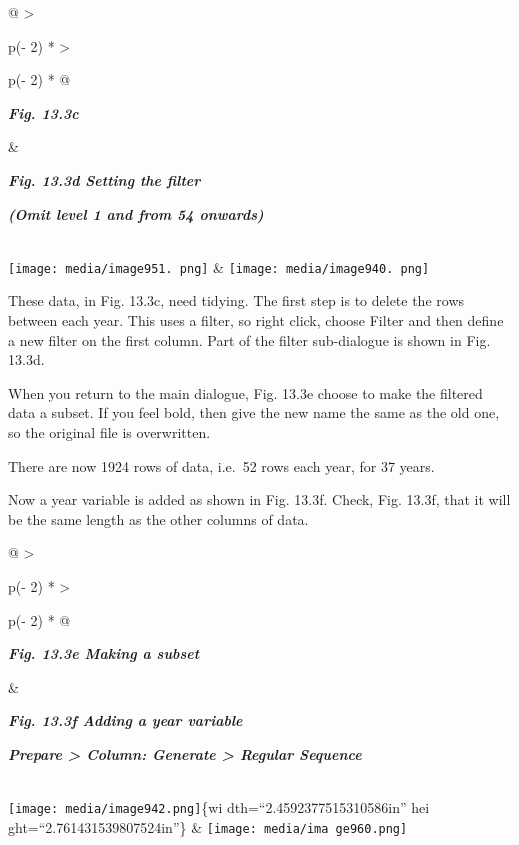 \documentclass[
  letterpaper,
  DIV=11,
  numbers=noendperiod]{scrreprt}
\begin{document}
\begin{longtable}[]{@{}
  >{\raggedright\arraybackslash}p{(\columnwidth - 2\tabcolsep) * }
  >{\raggedright\arraybackslash}p{(\columnwidth - 2\tabcolsep) * }@{}}
\toprule\noalign{}
\begin{minipage}[b]{\linewidth}\raggedright
\textbf{\emph{Fig. 13.3c}}
\end{minipage} & \begin{minipage}[b]{\linewidth}\raggedright
\textbf{\emph{Fig. 13.3d Setting the filter}}

\textbf{\emph{(Omit level 1 and from 54 onwards)}}
\end{minipage} \\
\midrule\noalign{}
\endhead
\bottomrule\noalign{}
\endlastfoot
\texttt{[image: media/image951. png]}
&
\texttt{[image: media/image940. png]} \\
\end{longtable}

These data, in Fig. 13.3c, need tidying. The first step is to delete the
rows between each year. This uses a filter, so right click, choose
Filter and then define a new filter on the first column. Part of the
filter sub-dialogue is shown in Fig. 13.3d.

When you return to the main dialogue, Fig. 13.3e choose to make the
filtered data a subset. If you feel bold, then give the new name the
same as the old one, so the original file is overwritten.

There are now 1924 rows of data, i.e.~52 rows each year, for 37 years.

Now a year variable is added as shown in Fig. 13.3f. Check, Fig. 13.3f,
that it will be the same length as the other columns of data.

\begin{longtable}[]{@{}
  >{\raggedright\arraybackslash}p{(\columnwidth - 2\tabcolsep) * }
  >{\raggedright\arraybackslash}p{(\columnwidth - 2\tabcolsep) * }@{}}
\toprule\noalign{}
\begin{minipage}[b]{\linewidth}\raggedright
\textbf{\emph{Fig. 13.3e Making a subset}}
\end{minipage} & \begin{minipage}[b]{\linewidth}\raggedright
\textbf{\emph{Fig. 13.3f Adding a year variable}}

\textbf{\emph{Prepare \textgreater{} Column: Generate \textgreater{}
Regular Sequence}}
\end{minipage} \\
\midrule\noalign{}
\endhead
\bottomrule\noalign{}
\endlastfoot
\texttt{[image: media/image942.png]}\{wi dth=``2.4592377515310586in''
hei ght=``2.761431539807524in''\} &
\texttt{[image: media/ima ge960.png]} \\
\end{longtable}
\end{document}
